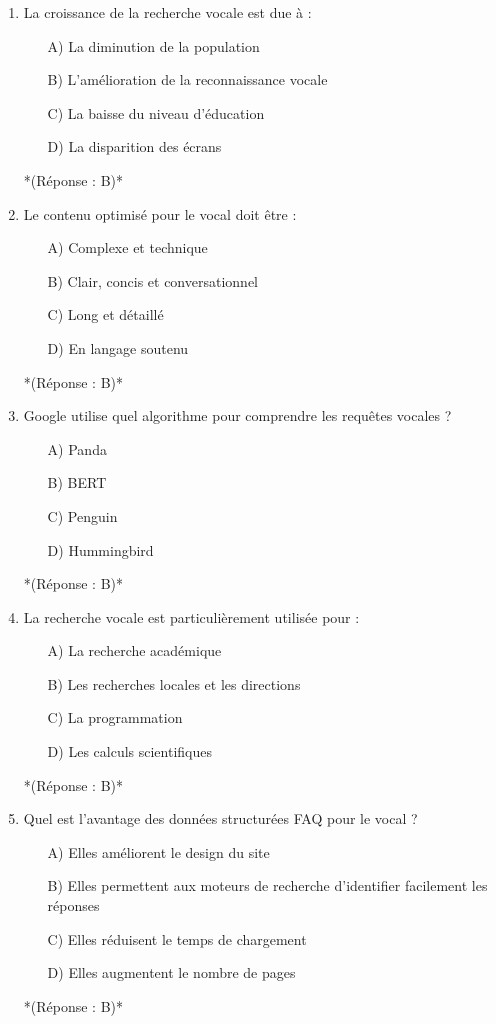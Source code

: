 \documentclass[12pt,a4paper,twoside]{report}
\begin{document}
\begin{enumerate}
    \item La croissance de la recherche vocale est due à :
    \begin{itemize}
        \item[A)] La diminution de la population
        \item[B)] L'amélioration de la reconnaissance vocale
        \item[C)] La baisse du niveau d'éducation
        \item[D)] La disparition des écrans
    \end{itemize}
    *(Réponse : B)*

    \item Le contenu optimisé pour le vocal doit être :
    \begin{itemize}
        \item[A)] Complexe et technique
        \item[B)] Clair, concis et conversationnel
        \item[C)] Long et détaillé
        \item[D)] En langage soutenu
    \end{itemize}
    *(Réponse : B)*

    \item Google utilise quel algorithme pour comprendre les requêtes vocales ?
    \begin{itemize}
        \item[A)] Panda
        \item[B)] BERT
        \item[C)] Penguin
        \item[D)] Hummingbird
    \end{itemize}
    *(Réponse : B)*

    \item La recherche vocale est particulièrement utilisée pour :
    \begin{itemize}
        \item[A)] La recherche académique
        \item[B)] Les recherches locales et les directions
        \item[C)] La programmation
        \item[D)] Les calculs scientifiques
    \end{itemize}
    *(Réponse : B)*

    \item Quel est l'avantage des données structurées FAQ pour le vocal ?
    \begin{itemize}
        \item[A)] Elles améliorent le design du site
        \item[B)] Elles permettent aux moteurs de recherche d'identifier facilement les réponses
        \item[C)] Elles réduisent le temps de chargement
        \item[D)] Elles augmentent le nombre de pages
    \end{itemize}
    *(Réponse : B)*


\end{enumerate}
\end{document}
